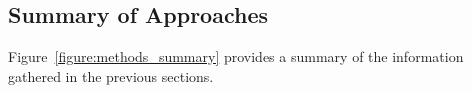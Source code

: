   \subsection{ Summary of Approaches }

  Figure~\ref{figure:methods_summary} provides a summary of the information
  gathered in the previous sections.

%
